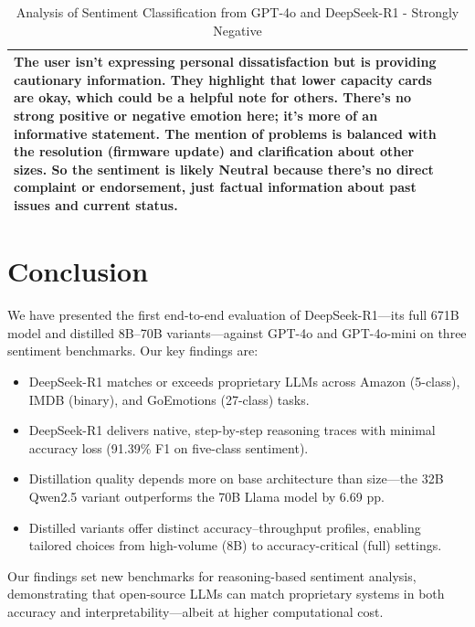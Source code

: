 \documentclass{IEEEcsmag}
\begin{document}
\begin{table}[htbp]
{\begin{tabular}{p{}|p{}}
The user isn't expressing personal dissatisfaction but is providing cautionary information. They highlight that lower capacity cards are okay, which could be a helpful note for others. There's no strong positive or negative emotion here; it's more of an informative statement. The mention of problems is balanced with the resolution (firmware update) and clarification about other sizes. So the sentiment is likely Neutral because there's no direct complaint or endorsement, just factual information about past issues and current status. \\
\hline
\end{tabular}
}
\caption{Analysis of Sentiment Classification from GPT-4o and DeepSeek-R1 - Strongly Negative}
\label{tab:sentiment-analysis-strongly-negative}
\end{table}

\vspace{-20pt}
\section{Conclusion}

We have presented the first end-to-end evaluation of DeepSeek-R1—its full 671B model and distilled 8B–70B variants—against GPT-4o and GPT-4o-mini on three sentiment benchmarks. Our key findings are:

\begin{itemize}[leftmargin=*,itemsep=2pt]
  \item DeepSeek-R1 matches or exceeds proprietary LLMs across Amazon (5-class), IMDB (binary), and GoEmotions (27-class) tasks.
  \item DeepSeek-R1 delivers native, step-by-step reasoning traces with minimal accuracy loss (91.39\% F1 on five-class sentiment).
  \item Distillation quality depends more on base architecture than size—the 32B Qwen2.5 variant outperforms the 70B Llama model by 6.69 pp.
  \item Distilled variants offer distinct accuracy–throughput profiles, enabling tailored choices from high-volume (8B) to accuracy-critical (full) settings.
\end{itemize}

\vspace{-3pt}
Our findings set new benchmarks for reasoning-based sentiment analysis, demonstrating that open-source LLMs can match proprietary systems in both accuracy and interpretability—albeit at higher computational cost. 
\end{document}

